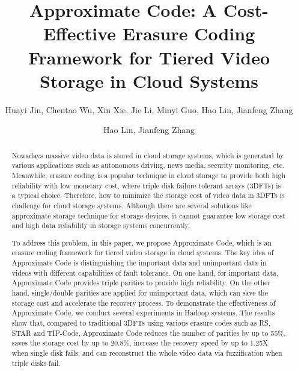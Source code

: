 \documentclass[sigconf]{acmart}
\begin{document}
\title{Approximate Code: A Cost-Effective Erasure Coding Framework for Tiered Video Storage in Cloud Systems}

\author{Huayi Jin, Chentao Wu, Xin Xie, Jie Li, Minyi Guo, Hao Lin, Jianfeng Zhang}


\author{Hao Lin, Jianfeng Zhang}
\authornotemark[1]

\begin{abstract}
Nowadays massive video data is stored in cloud storage systems, which is generated by various applications such as autonomous driving, news media, security monitoring, etc. Meanwhile, erasure coding is a popular technique in cloud storage to provide both high reliability with low monetary cost, where triple disk failure tolerant arrays (3DFTs) is a typical choice. Therefore, how to minimize the storage cost of video data in 3DFTs is challenge for cloud storage systems. Although there are several solutions like approximate storage technique for storage devices, it cannot guarantee low storage cost and high data reliability in storage systems concurrently.

To address this problem, in this paper, we propose Approximate Code, which is an erasure coding framework for tiered video storage in cloud systems. The key idea of Approximate Code is distinguishing the important data and unimportant data in videos with different capabilities of fault tolerance. On one hand, for important data, Approximate Code provides triple parities to provide high reliability. On the other hand, single/double parities are applied for unimportant data, which can save the storage cost and accelerate the recovery process. To demonstrate the effectiveness of Approximate Code, we conduct several experiments in Hadoop systems. The results show that, compared to traditional 3DFTs using various erasure codes such as RS, STAR and TIP-Code, Approximate Code reduces the number of parities by up to 55\%, saves the storage cost by up to 20.8\%, increase the recovery speed by up to 1.25X when single disk fails, and can reconstruct the whole video data via fuzzification when triple disks fail.
\end{abstract}


\maketitle
\end{document}
